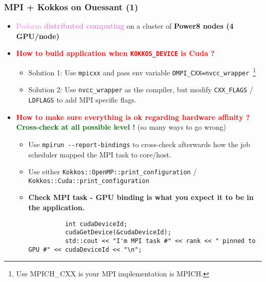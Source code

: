 \begin{frame}[fragile=singleslide]
  \frametitle{MPI + Kokkos on Ouessant (1)}

  \begin{itemize}
  \item \textcolor{violet}{Perform \textbf{distributed computing}} on a cluster of \textbf{Power8 nodes (4 GPU/node)}
  \item \textcolor{red}{\bf How to build application when \texttt{KOKKOS\_DEVICE} is Cuda ?}
    \begin{itemize}
    \item Solution 1: Use \texttt{mpicxx} and pass env variable \texttt{OMPI\_CXX=nvcc\_wrapper}~\footnote{Use MPICH\_CXX is your MPI implementation is MPICH.}
    \item Solution 2: Use \texttt{nvcc\_wrapper} as the compiler, but modify \texttt{CXX\_FLAGS} / \texttt{LDFLAGS} to add MPI specific flags.
    \end{itemize}
  \item \textcolor{red}{\bf How to make sure everything is ok regarding hardware affinity ? }
    \textcolor{darkgreen}{\textbf{Cross-check at all possible level !}} (so many ways to go wrong)
    \begin{itemize}
    \item Use \texttt{mpirun \--\--report-bindings} to cross-check afterwards how the job scheduler mapped the MPI task to core/host.
    \item Use either \texttt{Kokkos::OpenMP::print\_configuration} / \texttt{Kokkos::Cuda::print\_configuration}
    \item {\bf Check MPI task - GPU binding is what you expect it to be in the application.}
      {\scriptsize
        \begin{verbatim}
          int cudaDeviceId;
          cudaGetDevice(&cudaDeviceId);
          std::cout << "I'm MPI task #" << rank << " pinned to GPU #" << cudaDeviceId << "\n";
        \end{verbatim}
      }
    \end{itemize} 
  \end{itemize}

\end{frame}

